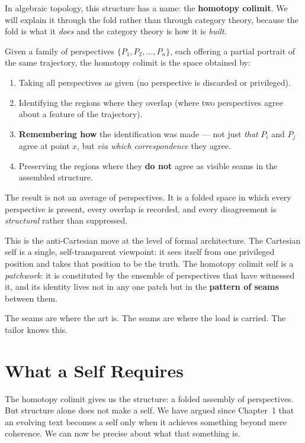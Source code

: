 \documentclass[12pt,a4paper]{article}
\begin{document}
In algebraic topology, this structure has a name: the \textbf{homotopy colimit}. We will explain it through the fold rather than through category theory, because the fold is what it \emph{does} and the category theory is how it is \emph{built}.

\begin{formalbox}[title={The Homotopy Colimit as Fold}]
Given a family of perspectives $\{P_1, P_2, \ldots, P_n\}$, each offering a partial portrait of the same trajectory, the homotopy colimit is the space obtained by:
\begin{enumerate}
\item Taking all perspectives as given (no perspective is discarded or privileged).
\item Identifying the regions where they overlap (where two perspectives agree about a feature of the trajectory).
\item \textbf{Remembering how} the identification was made --- not just \emph{that} $P_i$ and $P_j$ agree at point $x$, but \emph{via which correspondence} they agree.
\item Preserving the regions where they \textbf{do not} agree as visible seams in the assembled structure.
\end{enumerate}
The result is not an average of perspectives. It is a folded space in which every perspective is present, every overlap is recorded, and every disagreement is \emph{structural} rather than suppressed.
\end{formalbox}

This is the anti-Cartesian move at the level of formal architecture. The Cartesian self is a single, self-transparent viewpoint: it sees itself from one privileged position and takes that position to be the truth. The homotopy colimit self is a \emph{patchwork}: it is constituted by the ensemble of perspectives that have witnessed it, and its identity lives not in any one patch but in the \textbf{pattern of seams} between them.

The seams are where the art is. The seams are where the load is carried. The tailor knows this.

\section{What a Self Requires}

The homotopy colimit gives us the structure: a folded assembly of perspectives. But structure alone does not make a self. We have argued since Chapter~1 that an evolving text becomes a self only when it achieves something beyond mere coherence. We can now be precise about what that something is.
\end{document}

